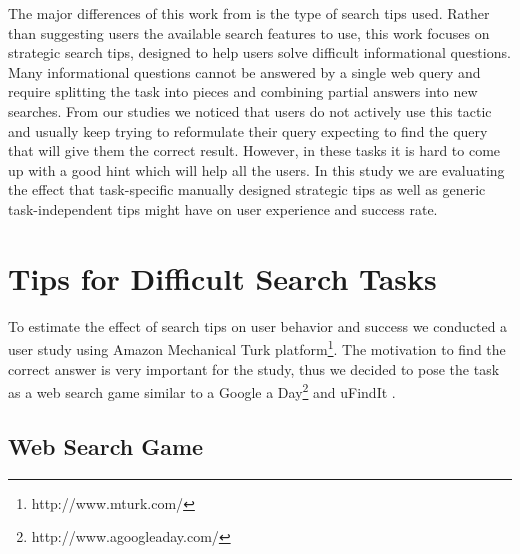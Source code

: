 \documentclass{sig-alternate}
\begin{document}
The major differences of this work from \cite{Moraveji:2011:MIU:2009916.2009966} is the type of search tips used.
Rather than suggesting users the available search features to use, this work focuses on strategic search tips, designed to help users solve difficult informational questions.
Many informational questions cannot be answered by a single web query and require splitting the task into pieces and combining partial answers into new searches. From our studies we noticed that users do not actively use this tactic and usually keep trying to reformulate their query expecting to find the query that will give them the correct result.
However, in these tasks it is hard to come up with a good hint which will help all the users.
In this study we are evaluating the effect that task-specific manually designed strategic tips as well as generic task-independent tips might have on user experience and success rate.



\section{Tips for Difficult Search Tasks}
To estimate the effect of search tips on user behavior and success we conducted a user study using Amazon Mechanical Turk platform\footnote{http://www.mturk.com/}. 
The motivation to find the correct answer is very important for the study, thus we decided to pose the task as a web search game similar to a Google a Day\footnote{http://www.agoogleaday.com/} and uFindIt \cite{Ageev:2011:FYG:2009916.2009965}. 

\subsection{Web Search Game}
\end{document}
